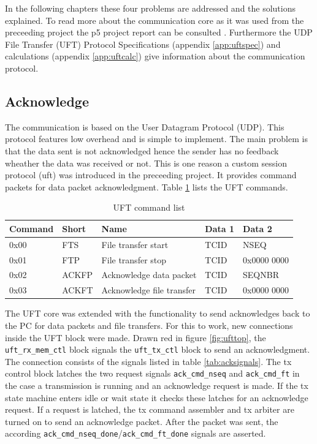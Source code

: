 In the following chapters these four problems are addressed and the solutions
explained. To read more about the communication core as it was used from the
preceeding project the p5 project report can be consulted \cite{p5report}.
Furthermore the UDP File Transfer (UFT) Protocol Specifications (appendix 
\ref{app:uftspec}) and calculations (appendix \ref{app:uftcalc}) give
information about the communication protocol.

\subsection{Acknowledge}
The communication is based on the User Datagram Protocol (UDP). This protocol
features low overhead and is simple to implement. The main problem is that the
data sent is not acknowledged hence the sender has no feedback wheather the data
was received or not. This is one reason a custom session protocol (\gls{uft})
was introduced in the preceeding project. It provides command packets for data
packet acknowledgment. Table \ref{tab:uftcommandlist} lists the UFT commands.


\begin{table}[t!]
    \centering
    \begin{tabular}{l l l l l}
        \toprule
        Command & Short & Name & Data 1 & Data 2 \\
        \midrule
        0x00 & FTS & 
        File transfer start & TCID & NSEQ
        \\
        0x01 & FTP &
        File transfer stop & TCID & 0x0000 0000
        \\
        0x02 & ACKFP &
        Acknowledge data packet & TCID & SEQNBR
        \\
        0x03 & ACKFT &
        Acknowledge file transfer & TCID & 0x0000 0000
        \\
        \bottomrule
    \end{tabular}
    \caption{UFT command list}
    \label{tab:uftcommandlist}
\end{table}

The UFT core was extended with the functionality to send acknowledges back to
the PC for data packets and file transfers. For this to work, new connections
inside the UFT block were made. Drawn red in figure \ref{fig:ufttop}, the 
\texttt{uft\_rx\_mem\_ctl} block signals the \texttt{uft\_tx\_ctl} block to send
an acknowledgment. The connection consists of the signals listed in table 
\ref{tab:acksignals}. The tx control block latches the two request signals 
\texttt{ack\_cmd\_nseq} and \texttt{ack\_cmd\_ft} in the case a transmission is
running and an acknowledge request is made. If the tx state machine enters idle
or wait state it checks these latches for an acknowledge request. If a request
is latched, the tx command assembler and tx arbiter are turned on to send an
acknowledge packet. After the packet was sent, the according 
\texttt{ack\_cmd\_nseq\_done}/\texttt{ack\_cmd\_ft\_done} signals are asserted.


